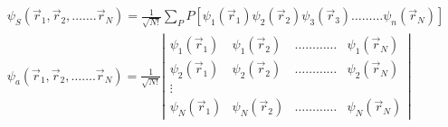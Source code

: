 $$\begin{aligned}
	&\psi_{S}\left(\vec{r}_{1}, \vec{r}_{2}, \ldots \ldots . \vec{r}_{N}\right)=\frac{1}{\sqrt{N !}} \sum_{P} \hat{P}\left[\psi_{1}\left(\vec{r}_{1}\right) \psi_{2}\left(\vec{r}_{2}\right) \psi_{3}\left(\vec{r}_{3}\right) \ldots \ldots \ldots \psi_{n}\left(\vec{r}_{N}\right)\right] \\
	&\psi_{a}\left(\vec{r}_{1}, \vec{r}_{2}, \ldots \ldots . \vec{r}_{N}\right)=\frac{1}{\sqrt{N !}}\left|\begin{array}{llll}
		\psi_{1}\left(\vec{r}_{1}\right) & \psi_{1}\left(\vec{r}_{2}\right) & \ldots \ldots \ldots \ldots & \psi_{1}\left(\vec{r}_{N}\right) \\
		\psi_{2}\left(\vec{r}_{1}\right) & \psi_{2}\left(\vec{r}_{2}\right) & \ldots \ldots \ldots \ldots & \psi_{2}\left(\vec{r}_{N}\right) \\
		\vdots & & & \\
		\psi_{N}\left(\vec{r}_{1}\right) & \psi_{N}\left(\vec{r}_{2}\right) & \ldots \ldots \ldots \ldots & \psi_{N}\left(\vec{r}_{N}\right)
	\end{array}\right|
\end{aligned}$$
